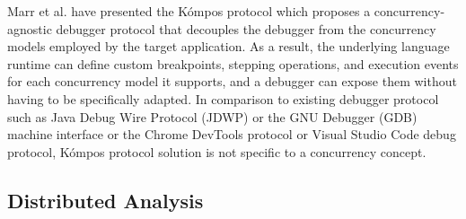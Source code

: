 Marr et al. have presented the Kómpos protocol \cite{Marr2017} which proposes a concurrency-agnostic debugger protocol that decouples the debugger from the concurrency models employed by the target application. As a result, the underlying language runtime can define custom breakpoints, stepping operations, and execution events for each concurrency model it supports, and a debugger can expose them without having to be specifically adapted. In comparison to existing debugger protocol such as Java Debug Wire Protocol (JDWP) or the GNU Debugger (GDB) machine interface or the Chrome DevTools protocol or Visual Studio Code debug protocol, Kómpos protocol solution is not specific to a concurrency concept.








\subsection{Distributed Analysis}

